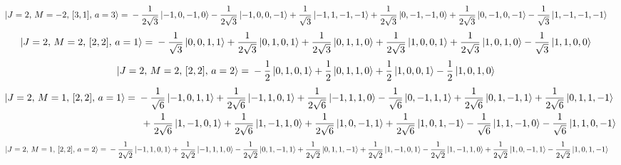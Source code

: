 \documentclass{article}
\begin{document}
\begin{equation*}
\begin{aligned}
\ket{J=2,\,M=-2,\,[3,1],\,a=3} = \; &- \frac{1}{2\sqrt{3}} \ket{-1,0,-1,0} - \frac{1}{2\sqrt{3}} \ket{-1,0,0,-1} + \frac{1}{\sqrt{3}} \ket{-1,1,-1,-1} + \frac{1}{2\sqrt{3}} \ket{0,-1,-1,0} + \frac{1}{2\sqrt{3}} \ket{0,-1,0,-1} - \frac{1}{\sqrt{3}} \ket{1,-1,-1,-1}
\end{aligned}
\end{equation*}
\begin{equation*}
\begin{aligned}
\ket{J=2,\,M=2,\,[2,2],\,a=1} = \; &- \frac{1}{\sqrt{3}} \ket{0,0,1,1} + \frac{1}{2\sqrt{3}} \ket{0,1,0,1} + \frac{1}{2\sqrt{3}} \ket{0,1,1,0} + \frac{1}{2\sqrt{3}} \ket{1,0,0,1} + \frac{1}{2\sqrt{3}} \ket{1,0,1,0} - \frac{1}{\sqrt{3}} \ket{1,1,0,0}
\end{aligned}
\end{equation*}
\begin{equation*}
\begin{aligned}
\ket{J=2,\,M=2,\,[2,2],\,a=2} = \; &- \frac{1}{2} \ket{0,1,0,1} + \frac{1}{2} \ket{0,1,1,0} + \frac{1}{2} \ket{1,0,0,1} - \frac{1}{2} \ket{1,0,1,0}
\end{aligned}
\end{equation*}
{\small
\begin{equation*}
\begin{aligned}
\ket{J=2,\,M=1,\,[2,2],\,a=1} = \; &- \frac{1}{\sqrt{6}} \ket{-1,0,1,1} + \frac{1}{2\sqrt{6}} \ket{-1,1,0,1} + \frac{1}{2\sqrt{6}} \ket{-1,1,1,0} - \frac{1}{\sqrt{6}} \ket{0,-1,1,1} + \frac{1}{2\sqrt{6}} \ket{0,1,-1,1} + \frac{1}{2\sqrt{6}} \ket{0,1,1,-1} \\
  & \; + \frac{1}{2\sqrt{6}} \ket{1,-1,0,1} + \frac{1}{2\sqrt{6}} \ket{1,-1,1,0} + \frac{1}{2\sqrt{6}} \ket{1,0,-1,1} + \frac{1}{2\sqrt{6}} \ket{1,0,1,-1} - \frac{1}{\sqrt{6}} \ket{1,1,-1,0} - \frac{1}{\sqrt{6}} \ket{1,1,0,-1}
\end{aligned}
\end{equation*}}
\begin{equation*}
\begin{aligned}
\ket{J=2,\,M=1,\,[2,2],\,a=2} = \; &- \frac{1}{2\sqrt{2}} \ket{-1,1,0,1} + \frac{1}{2\sqrt{2}} \ket{-1,1,1,0} - \frac{1}{2\sqrt{2}} \ket{0,1,-1,1} + \frac{1}{2\sqrt{2}} \ket{0,1,1,-1} + \frac{1}{2\sqrt{2}} \ket{1,-1,0,1} - \frac{1}{2\sqrt{2}} \ket{1,-1,1,0} + \frac{1}{2\sqrt{2}} \ket{1,0,-1,1} - \frac{1}{2\sqrt{2}} \ket{1,0,1,-1}
\end{aligned}
\end{equation*}
\end{document}
